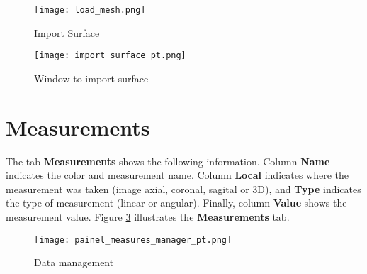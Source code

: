 \begin{figure}[!htb]
\centering
\texttt{[image: load\_mesh.png]}
\caption{Import Surface}
\label{fig:import_stl}
\end{figure}

\begin{figure}[!htb]
\centering
\texttt{[image: import\_surface\_pt.png]}
\caption{Window to import surface}
\label{fig:import_surface}
\end{figure}

\newpage


\section{Measurements}


The tab \textbf{Measurements} shows the following information. Column \textbf{Name} indicates the color and measurement
name. Column \textbf{Local} indicates where the measurement was taken (image axial, coronal, sagital or 3D), and
\textbf{Type} indicates the type of measurement (linear or angular). Finally, column \textbf{Value} shows the
measurement value. Figure \ref{fig:manager_mensuares} illustrates the \textbf{Measurements} tab.

\begin{figure}[!htb]
\centering
\texttt{[image: painel\_measures\_manager\_pt.png]}
\caption{Data management}
\label{fig:manager_mensuares}
\end{figure}

